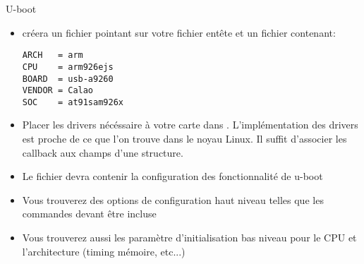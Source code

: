 \begin{frame}[fragile=singleslide]{U-boot}
  \begin{itemize}
  \item {} créera  un fichier  pointant sur
    votre fichier entête et un fichier  contenant:
    \begin{lstlisting} 
ARCH   = arm
CPU    = arm926ejs
BOARD  = usb-a9260
VENDOR = Calao
SOC    = at91sam926x
    \end{lstlisting} 
  \item   Placer   les  drivers   nécéssaire   à   votre  carte   dans
    . L'implémentation des drivers est proche de
    ce que l'on  trouve dans le noyau Linux.  Il suffit d'associer les
    callback aux champs d'une structure.
  \item Le fichier   devra contenir la configuration
    des fonctionnalité de u-boot
  \item Vous trouverez des options de configuration haut niveau telles
    que les commandes devant être incluse
  \item Vous trouverez aussi les paramètre d'initialisation bas niveau
    pour le CPU et l'architecture (timing mémoire, etc...)
  \end{itemize}
\end{frame}





